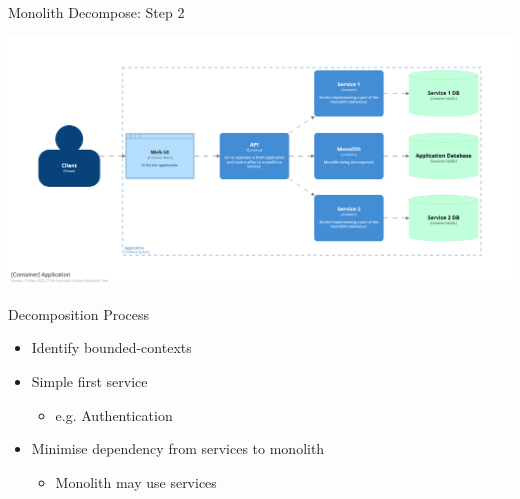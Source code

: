 \documentclass{slide}
\begin{document}
\begin{frame}{Monolith Decompose: Step 2}
    \begin{adjustwidth}{-12mm}{-12mm}
        \centering
        \includegraphics[trim=195 195 195 195,clip,width=0.97\paperwidth]{diagrams/decompose3.png}
    \end{adjustwidth}
\end{frame}

\begin{frame}{Decomposition Process}
\vspace{1pt}
{\huge
\begin{itemize}
    \item Identify bounded-contexts
    \vspace{3mm}
    \item Simple first service
    \begin{itemize}
        \LARGE\item e.g. Authentication
    \end{itemize}
    \vspace{3mm}
    \item Minimise dependency from services to monolith
    \begin{itemize}
        \LARGE\item Monolith may use services
    \end{itemize}
\end{itemize}
}
\end{frame}
\end{document}

